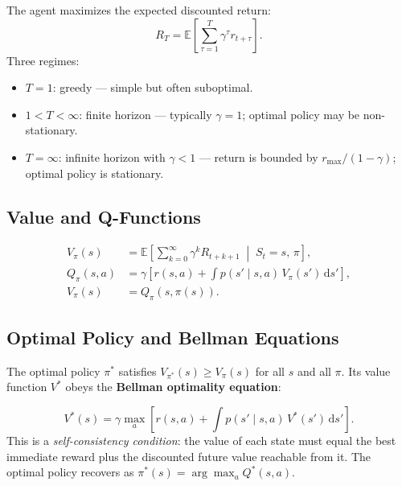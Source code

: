 \documentclass[11pt,a4paper]{article}
\theoremstyle{definition}
\theoremstyle{plain}
\theoremstyle{remark}
\begin{document}
The agent maximizes the expected discounted return:
\[
    R_T = \mathbb{E}\!\left[\sum_{\tau=1}^{T} \gamma^\tau r_{t+\tau}\right].
\]
Three regimes:
\begin{itemize}
    \item $T=1$: greedy — simple but often suboptimal.
    \item $1 < T < \infty$: finite horizon — typically $\gamma = 1$; optimal policy may be non-stationary.
    \item $T = \infty$: infinite horizon with $\gamma < 1$ — return is bounded by $r_{\max}/(1-\gamma)$; optimal policy is stationary.
\end{itemize}

\subsection{Value and Q-Functions}

\begin{tcolorbox}[colback=blue!5!white,colframe=blue!75!black,title=\textbf{Value and Action-Value Functions}]
\begin{align*}
    V_\pi(s) &= \mathbb{E}\!\left[\sum_{k=0}^{\infty} \gamma^k R_{t+k+1} \;\middle|\; S_t = s,\, \pi\right], \\[4pt]
    Q_\pi(s, a) &= \gamma\!\left[r(s,a) + \int p(s' \mid s, a)\, V_\pi(s')\,\mathrm{d}s'\right], \\[4pt]
    V_\pi(s) &= Q_\pi(s, \pi(s)).
\end{align*}
\end{tcolorbox}

\subsection{Optimal Policy and Bellman Equations}

The optimal policy $\pi^*$ satisfies $V_{\pi^*}(s) \ge V_\pi(s)$ for all $s$ and all $\pi$. Its value function $V^*$ obeys the \textbf{Bellman optimality equation}:

\begin{tcolorbox}[colback=blue!5!white,colframe=blue!75!black,title=\textbf{Bellman Optimality Equation}]
\[
    V^*(s) = \gamma\max_a \!\left[r(s, a) + \int p(s' \mid s, a)\, V^*(s')\,\mathrm{d}s'\right].
\]
This is a \emph{self-consistency condition}: the value of each state must equal the best immediate reward plus the discounted future value reachable from it. The optimal policy recovers as $\pi^*(s) = \arg\max_a Q^*(s,a)$.
\end{tcolorbox}
\end{document}
